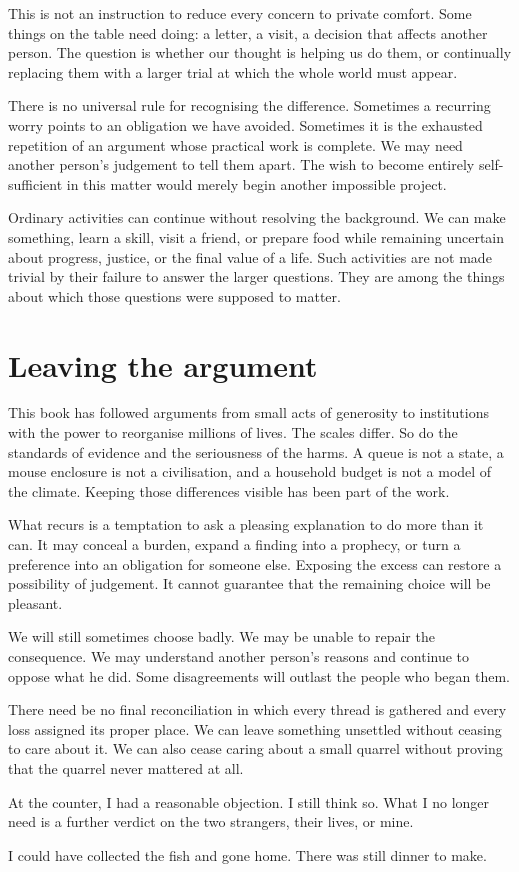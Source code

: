 \documentclass[12pt,a4paper]{book}
\begin{document}
This is not an instruction to reduce every concern to private comfort. Some things on the table need doing: a letter, a visit, a decision that affects another person. The question is whether our thought is helping us do them, or continually replacing them with a larger trial at which the whole world must appear.

There is no universal rule for recognising the difference. Sometimes a recurring worry points to an obligation we have avoided. Sometimes it is the exhausted repetition of an argument whose practical work is complete. We may need another person's judgement to tell them apart. The wish to become entirely self-sufficient in this matter would merely begin another impossible project.

Ordinary activities can continue without resolving the background. We can make something, learn a skill, visit a friend, or prepare food while remaining uncertain about progress, justice, or the final value of a life. Such activities are not made trivial by their failure to answer the larger questions. They are among the things about which those questions were supposed to matter.

\section*{Leaving the argument}

This book has followed arguments from small acts of generosity to institutions with the power to reorganise millions of lives. The scales differ. So do the standards of evidence and the seriousness of the harms. A queue is not a state, a mouse enclosure is not a civilisation, and a household budget is not a model of the climate. Keeping those differences visible has been part of the work.

What recurs is a temptation to ask a pleasing explanation to do more than it can. It may conceal a burden, expand a finding into a prophecy, or turn a preference into an obligation for someone else. Exposing the excess can restore a possibility of judgement. It cannot guarantee that the remaining choice will be pleasant.

We will still sometimes choose badly. We may be unable to repair the consequence. We may understand another person's reasons and continue to oppose what he did. Some disagreements will outlast the people who began them.

There need be no final reconciliation in which every thread is gathered and every loss assigned its proper place. We can leave something unsettled without ceasing to care about it. We can also cease caring about a small quarrel without proving that the quarrel never mattered at all.

At the counter, I had a reasonable objection. I still think so. What I no longer need is a further verdict on the two strangers, their lives, or mine.

I could have collected the fish and gone home. There was still dinner to make.
\end{document}

